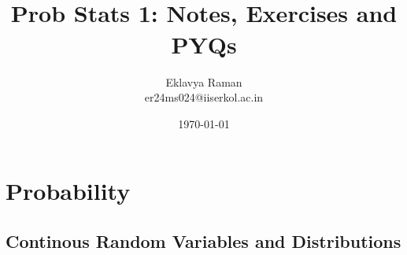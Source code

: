 \documentclass[openany]{book}
\begin{document}
\title{\Large{} \\ \vspace{5pt}
\large{Prob Stats 1: Notes, Exercises and PYQs}}
\author{Eklavya Raman \\ \vspace{5pt} er24ms024@iiserkol.ac.in \\ \vspace{5pt}}
\date{\today}
\maketitle
\tableofcontents
\listoftheorems[
    show=mytheorem,
    title={List of Theorems}]

\part{Probability}
\chapter{Continous Random Variables and Distributions}
\end{document}
